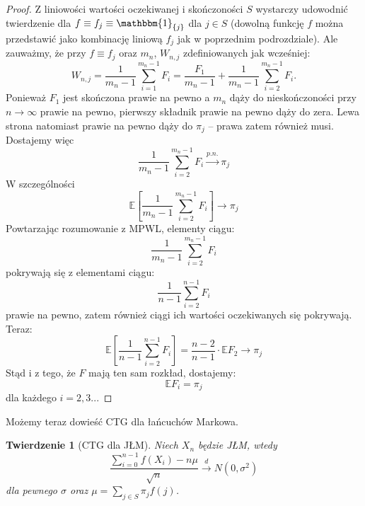 \documentclass[a4paper]{article}
\theoremstyle{defn}
\theoremstyle{theorem}
\newtheorem{theorem}[defn]{Twierdzenie}
\theoremstyle{lemma}
\theoremstyle{cor}
\theoremstyle{fact}
\begin{document}
\begin{proof} Z liniowości wartości oczekiwanej i skończoności $S$ wystarczy udowodnić twierdzenie dla $f \equiv f_j \equiv \mathbbm{1}_{\{j\}}$ dla $j \in S$ (dowolną funkcję $f$ można przedstawić jako kombinację liniową $f_j$ jak w poprzednim podrozdziale). Ale zauważmy, że przy $f \equiv f_j$ oraz $m_n$, $W_{n, j}$ zdefiniowanych jak wcześniej: $$W_{n, j} = \frac{1}{m_n -1}\sum\limits_{i = 1}^{m_n -1} F_i = \frac{F_1}{m_n - 1} + \frac{1}{m_n - 1} \sum\limits_{i = 2}^{m_n - 1} F_i.$$
Ponieważ $F_1$ jest skończona prawie na pewno a $m_n$ dąży do nieskończoności przy $n \to \infty$ prawie na pewno, pierwszy składnik prawie na pewno dąży do zera. Lewa strona natomiast prawie na pewno dąży do $\pi_j$ – prawa zatem również musi. Dostajemy więc
$$\frac{1}{m_n - 1} \sum\limits_{i = 2}^{m_n - 1} F_i \overset{p.n.}{\to} \pi_j$$
W szczególności
$$\mathbb{E}\left[\frac{1}{m_n - 1} \sum\limits_{i = 2}^{m_n - 1} F_i\right] \to \pi_j$$
Powtarzając rozumowanie z MPWL, elementy ciągu:
$$\frac{1}{m_n - 1} \sum\limits_{i = 2}^{m_n - 1} F_i$$
pokrywają się z elementami ciągu:
$$\frac{1}{n - 1} \sum\limits_{i = 2}^{n - 1} F_i$$
prawie na pewno, zatem również ciągi ich wartości oczekiwanych się pokrywają. Teraz:
$$\mathbb{E}\left[\frac{1}{n - 1} \sum\limits_{i = 2}^{n - 1} F_i\right] = \frac{n-2}{n - 1}\cdot \mathbb{E}F_2 \to \pi_j$$
Stąd i z tego, że $F$ mają ten sam rozkład, dostajemy:
$$\mathbb{E}F_i = \pi_j$$
dla każdego $i = 2,3...$
\end{proof}
Możemy teraz dowieść CTG dla łańcuchów Markowa.
\begin{theorem}[CTG dla JŁM]\label{theorem2.6.5}
Niech $X_n$ będzie JŁM, wtedy
$$ \frac{\sum\limits_{i=0}^{n-1} f(X_i) - n\mu}{\sqrt{n}} \overset{d}{\to} N(0, \sigma^2)$$
dla pewnego $\sigma$ oraz $\mu = \sum\limits_{j \in S} \pi_j f(j)$.
\end{theorem}
\end{document}
